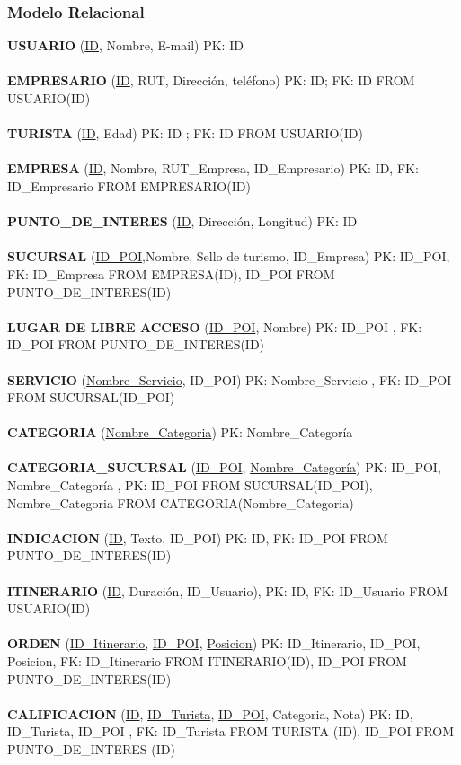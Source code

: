 \documentclass[12pt]{article}
\begin{document}
\subsubsection{Modelo Relacional}
\textbf{USUARIO} (\underline{ID}, Nombre, E-mail) PK: ID\\\\
\textbf{EMPRESARIO} (\underline{ID}, RUT, Dirección, teléfono) PK: ID; FK: ID FROM USUARIO(ID)\\\\
\textbf{TURISTA} (\underline{ID}, Edad) PK: ID ; FK: ID FROM USUARIO(ID)\\\\
\textbf{EMPRESA} (\underline{ID}, Nombre, RUT\_Empresa, ID\_Empresario) PK: ID, FK: ID\_Empresario FROM EMPRESARIO(ID)\\\\
\textbf{PUNTO\_DE\_INTERES} (\underline{ID}, Dirección, Longitud) PK: ID\\\\
\textbf{SUCURSAL} (\underline{ID\_POI},Nombre, Sello de turismo, ID\_Empresa) PK: ID\_POI, FK: ID\_Empresa FROM EMPRESA(ID), ID\_POI FROM PUNTO\_DE\_INTERES(ID)\\\\
\textbf{LUGAR DE LIBRE ACCESO} (\underline{ID\_POI}, Nombre) PK: ID\_POI , FK: ID\_POI FROM PUNTO\_DE\_INTERES(ID)\\\\
\textbf{SERVICIO} (\underline{Nombre\_Servicio}, ID\_POI) PK: Nombre\_Servicio , FK: ID\_POI FROM SUCURSAL(ID\_POI)\\\\
\textbf{CATEGORIA} (\underline{Nombre\_Categoria}) PK: Nombre\_Categoría\\\\
\textbf{CATEGORIA\_SUCURSAL} (\underline{ID\_POI}, \underline{Nombre\_Categoría}) PK: ID\_POI, Nombre\_Categoría , PK: ID\_POI FROM SUCURSAL(ID\_POI), Nombre\_Categoria FROM CATEGORIA(Nombre\_Categoria)\\\\
\textbf{INDICACION} (\underline{ID}, Texto, ID\_POI) PK: ID, FK: ID\_POI FROM PUNTO\_DE\_INTERES(ID)\\\\
\textbf{ITINERARIO} (\underline{ID}, Duración, ID\_Usuario), PK: ID, FK: ID\_Usuario FROM USUARIO(ID)\\\\
\textbf{ORDEN} (\underline{ID\_Itinerario}, \underline{ID\_POI}, \underline{Posicion}) PK: ID\_Itinerario, ID\_POI, Posicion, FK: ID\_Itinerario FROM ITINERARIO(ID), ID\_POI FROM PUNTO\_DE\_INTERES(ID)\\\\
\textbf{CALIFICACION} (\underline{ID}, \underline{ID\_Turista}, \underline{ID\_POI}, Categoria, Nota) PK: ID, ID\_Turista, ID\_POI , FK: ID\_Turista FROM TURISTA (ID), ID\_POI FROM PUNTO\_DE\_INTERES (ID)
\end{document}
